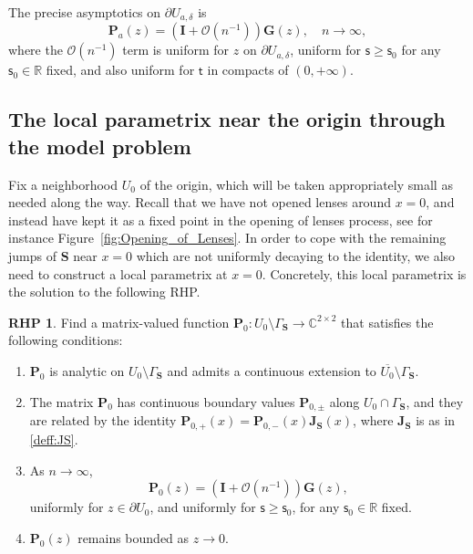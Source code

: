 \documentclass[reqno,a4paper,11pt]{amsart}
\newcommand{\C}{\mathbb{C}}
\newcommand{\R}{\mathbb{R}}
\newcommand{\Boh}{\mathcal{O}}
\renewcommand{\bm}{\mathbf}
\newcommand{\msf}{\mathsf}
\newcommand{\tad}{\msf t}
\newcommand{\sad}{\msf s}
\theoremstyle{definition}
\newtheorem{rhp}[theorem]{RHP}
\theoremstyle{remark}
\numberwithin{equation}{section}
\begin{document}
    The precise asymptotics on $\partial U_{a,\delta}$ is
    \begin{equation}\label{eq:precise_asymptotics_P_a}
        \bm P_a(z) = \left( \bm I + \Boh(n^{-1}) \right) \bm G(z), \quad n \to \infty,
    \end{equation}
    where the $\Boh(n^{-1})$ term is uniform for $z$ on $\partial U_{a,\delta}$, uniform for $\sad \geq \sad_0$ for any $\sad_0\in \R$ fixed, and also uniform for $\tad$ in compacts of $(0,+\infty)$.
    
\subsection{The local parametrix near the origin through the model problem}\label{sec:local_0}\hfill
%

Fix a neighborhood $U_0$ of the origin, which will be taken appropriately small as needed along the way. Recall that we have not opened lenses around $x=0$, and instead have kept it as a fixed point in the opening of lenses process, see for instance Figure~\ref{fig:Opening_of_Lenses}. In order to cope with the remaining jumps of $\bm S$ near $x=0$ which are not uniformly decaying to the identity, we also need to construct a local parametrix at $x=0$. Concretely, this local parametrix is the solution to the following RHP.
%
\begin{rhp}\label{rhp:localP0}
    Find a matrix-valued function $\bm P_0: U_0 \setminus \Gamma_{\bm S} \to \C^{2 \times 2}$ that satisfies the following conditions:
    \begin{enumerate}[\rm (i)]
        \item $\bm P_0$ is analytic on $U_0\setminus \Gamma_{\bm S}$ and admits a continuous extension to $\overline{U_0} \setminus \Gamma_{\bm S}$.
        \item The matrix $\bm P_0$ has continuous boundary values $\bm P_{0,\pm}$ along $U_0 \cap \Gamma_{\bm S}$, and they are related by the identity $\bm P_{0,+}(x) = \bm P_{0,-}(x) \bm J_{\bm S}(x)$, where $\bm J_{\bm S}$ is as in \eqref{deff:JS}.
        
        \item As $n \to \infty$,
        \[
            \bm P_0(z) = \left( \bm I + \Boh(n^{-1})\right) \bm G(z),
        \]
        uniformly for $z\in  \partial U_0$, and uniformly for $\sad \geq \sad_0$, for any $\sad_0\in \R$ fixed.
        \item   $\bm P_0(z)$ remains bounded as $z \to 0$.
    \end{enumerate}
\end{rhp}
\end{document}
